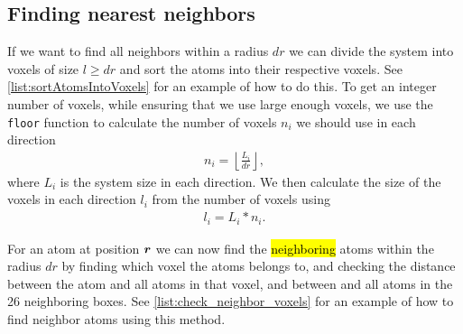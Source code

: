 \subsection{Finding nearest neighbors}
If we want to find all neighbors within a radius $dr$ we can divide the system into voxels of size $l \geq dr$ and sort the atoms into their respective voxels. See \cref{list:sortAtomsIntoVoxels} for an example of how to do this. To get an integer number of voxels, while ensuring that we use large enough voxels, we use the \Verb!floor! function to calculate the number of voxels $n_i$ we should use in each direction
\begin{align*}
    n_i = \left\lfloor \frac{L_i}{dr} \right\rfloor,
\end{align*}
where $L_i$ is the system size in each direction. We then calculate the size of the voxels in each direction $l_i$ from the number of voxels using
\begin{align*}
    l_i = L_i*n_i.
\end{align*}

For an atom at position $\boldsymbol{r}$ we can now find the \hl{neighboring} atoms within the radius $dr$ by finding which voxel the atoms belongs to, and checking the distance between the atom and all atoms in that voxel, and between and all atoms in the 26 neighboring boxes. See \cref{list:check_neighbor_voxels} for an example of how to find neighbor atoms using this method.




